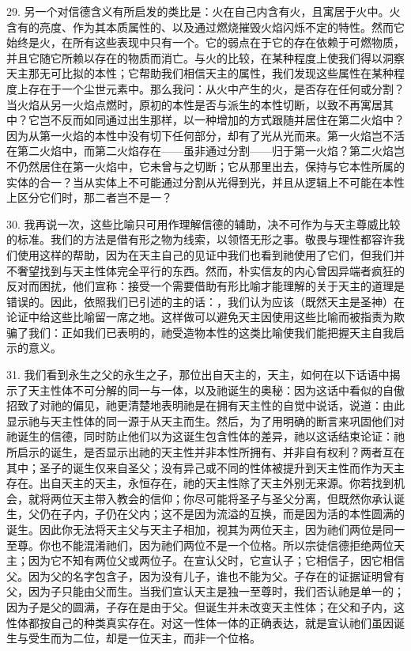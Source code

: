 29. 另一个对信德含义有所启发的类比是：火在自己内含有火，且寓居于火中。火含有的亮度、作为其本质属性的、以及通过燃烧摧毁火焰闪烁不定的特性。然而它始终是火，在所有这些表现中只有一个。它的弱点在于它的存在依赖于可燃物质，并且它随它所赖以存在的物质而消亡。与火的比较，在某种程度上使我们得以洞察天主那无可比拟的本性；它帮助我们相信天主的属性，我们发现这些属性在某种程度上存在于一个尘世元素中。那么我问：从火中产生的火，是否存在任何或分割？当火焰从另一火焰点燃时，原初的本性是否与派生的本性切断，以致不再寓居其中？它岂不反而如同通过出生那样，以一种增加的方式跟随并居住在第二火焰中？因为从第一火焰的本性中没有切下任何部分，却有了光从光而来。第一火焰岂不活在第二火焰中，而第二火焰存在——虽非通过分割——归于第一火焰？第二火焰岂不仍然居住在第一火焰中，它未曾与之切断；它从那里出去，保持与它本性所属的实体的合一？当从实体上不可能通过分割从光得到光，并且从逻辑上不可能在本性上区分它们时，那二者岂不是一？\par

30. 我再说一次，这些比喻只可用作理解信德的辅助，决不可作为与天主尊威比较的标准。我们的方法是借有形之物为线索，以领悟无形之事。敬畏与理性都容许我们使用这样的帮助，因为在天主自己的见证中我们也看到祂使用了它们，但我们并不奢望找到与天主性体完全平行的东西。然而，朴实信友的内心曾因异端者疯狂的反对而困扰，他们宣称：接受一个需要借助有形比喻才能理解的关于天主的道理是错误的。因此，依照我们已引述的主的话：，我们认为应该（既然天主是圣神）在论证中给这些比喻留一席之地。这样做可以避免天主因使用这些比喻而被指责为欺骗了我们：正如我们已表明的，祂受造物本性的这类比喻使我们能把握天主自我启示的意义。\par

31. 我们看到永生之父的永生之子，那位出自天主的，天主，如何在以下话语中揭示了天主性体不可分解的同一与一体，以及祂诞生的奥秘：因为这话中看似的自傲招致了对祂的偏见，祂更清楚地表明祂是在拥有天主性的自觉中说话，说道：由此显示祂与天主性体的同一源于从天主而生。然后，为了用明确的断言来巩固他们对祂诞生的信德，同时防止他们以为这诞生包含性体的差异，祂以这话结束论证：祂所启示的诞生，是否显示出祂的天主性并非本性所拥有、并非自有权利？两者互在其中；圣子的诞生仅来自圣父；没有异己或不同的性体被提升到天主性而作为天主存在。出自天主的天主，永恒存在，祂的天主性除了天主外别无来源。你若找到机会，就将两位天主带入教会的信仰；你尽可能将圣子与圣父分离，但既然你承认诞生，父仍在子内，子仍在父内；这不是因为流溢的互换，而是因为活的本性圆满的诞生。因此你无法将天主父与天主子相加，视其为两位天主，因为祂们两位是同一至尊。你也不能混淆祂们，因为祂们两位不是一个位格。所以宗徒信德拒绝两位天主；因为它不知有两位父或两位子。在宣认父时，它宣认子；它相信子，因它相信父。因为父的名字包含子，因为没有儿子，谁也不能为父。子存在的证据证明曾有父，因为子只能由父而生。当我们宣认天主是独一至尊时，我们否认祂是单一的；因为子是父的圆满，子存在是由于父。但诞生并未改变天主性体；在父和子内，这性体都按自己的种类真实存在。对这一性体一体的正确表达，就是宣认祂们虽因诞生与受生而为二位，却是一位天主，而非一个位格。\par

